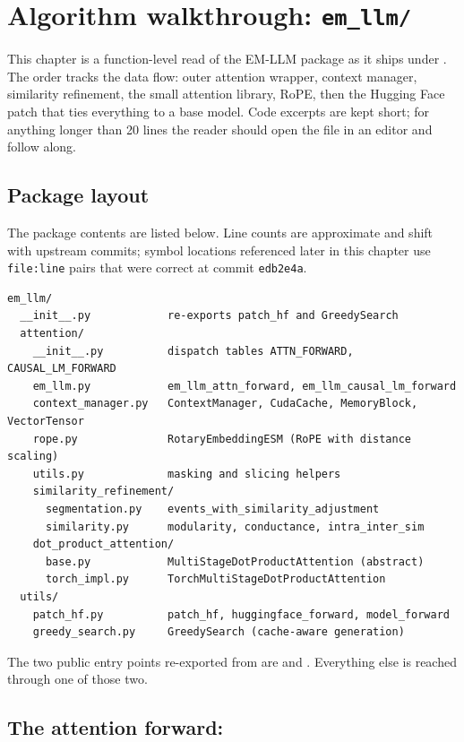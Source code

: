 \section{Algorithm walkthrough: \texttt{em\_llm/}}
\label{sec:walkthrough}

This chapter is a function-level read of the EM-LLM package as it ships under . The order tracks the data flow: outer attention wrapper, context manager, similarity refinement, the small attention library, RoPE, then the Hugging Face patch that ties everything to a base model. Code excerpts are kept short; for anything longer than 20 lines the reader should open the file in an editor and follow along.

\subsection{Package layout}
\label{sec:walkthrough-layout}

The package contents are listed below. Line counts are approximate and shift with upstream commits; symbol locations referenced later in this chapter use \texttt{file:line} pairs that were correct at commit \texttt{edb2e4a}.

\begin{lstlisting}[style=shellstyle,basicstyle=\ttfamily\footnotesize]
em_llm/
  __init__.py            re-exports patch_hf and GreedySearch
  attention/
    __init__.py          dispatch tables ATTN_FORWARD, CAUSAL_LM_FORWARD
    em_llm.py            em_llm_attn_forward, em_llm_causal_lm_forward
    context_manager.py   ContextManager, CudaCache, MemoryBlock, VectorTensor
    rope.py              RotaryEmbeddingESM (RoPE with distance scaling)
    utils.py             masking and slicing helpers
    similarity_refinement/
      segmentation.py    events_with_similarity_adjustment
      similarity.py      modularity, conductance, intra_inter_sim
    dot_product_attention/
      base.py            MultiStageDotProductAttention (abstract)
      torch_impl.py      TorchMultiStageDotProductAttention
  utils/
    patch_hf.py          patch_hf, huggingface_forward, model_forward
    greedy_search.py     GreedySearch (cache-aware generation)
\end{lstlisting}

The two public entry points re-exported from  are  and . Everything else is reached through one of those two.

\subsection{The attention forward: }
\label{sec:walkthrough-em-llm}

